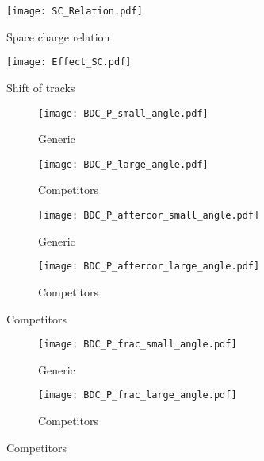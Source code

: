 \begin{figure}[H]
\texttt{[image: SC\_Relation.pdf]}
\caption{Space charge relation}
\label{fig:spacechg_relation}
\end{figure}


\begin{figure}[H]
\texttt{[image: Effect\_SC.pdf]}
\caption{Shift of tracks}
\label{fig:sc_shift}
\end{figure}


\begin{figure}[!htb]
    \centering
    \begin{subfigure}[t]{0.45\textwidth}
        \centering
        \texttt{[image: BDC\_P\_small\_angle.pdf]} 
        \caption{Generic} \label{fig:mom_S_before}
    \end{subfigure}
    \hfill
    \begin{subfigure}[t]{0.45\textwidth}
        \centering
        \texttt{[image: BDC\_P\_large\_angle.pdf]} 
        \caption{Competitors} \label{fig:mom_L_before}
    \end{subfigure}
    
    \begin{subfigure}[t]{0.45\textwidth}
        \centering
        \texttt{[image: BDC\_P\_aftercor\_small\_angle.pdf]} 
        \caption{Generic} \label{fig:mom_S_after}
    \end{subfigure}
    \hfill
    \begin{subfigure}[t]{0.45\textwidth}
        \centering
        \texttt{[image: BDC\_P\_aftercor\_large\_angle.pdf]} 
        \caption{Competitors} \label{fig:mom_L_after}
    \end{subfigure}
\label{fig:mom_sc}
\end{figure}



\begin{figure}[!htb]
    \centering
    \begin{subfigure}[t]{0.49\textwidth}
        \centering
        \texttt{[image: BDC\_P\_frac\_small\_angle.pdf]} 
        \caption{Generic} \label{fig:mom_S_1D}
    \end{subfigure}
    \hfill
    \begin{subfigure}[t]{0.49\textwidth}
        \centering
        \texttt{[image: BDC\_P\_frac\_large\_angle.pdf]} 
        \caption{Competitors} \label{fig:mom_L_1D}
    \end{subfigure}
    
\label{fig:mom_1D}
\end{figure}



